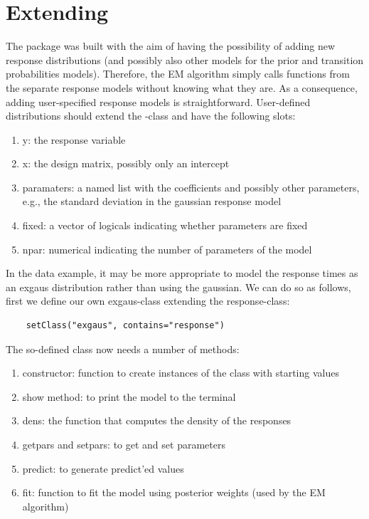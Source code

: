 \documentclass[article]{jss}
\begin{document}
\section[Extending depmixS4]{Extending }

The  package was built with the aim of having the 
possibility of adding new response distributions (and possibly also 
other models for the prior and transition probabilities models). 
Therefore, the EM algorithm simply calls  functions from the 
separate response models without knowing what they are. As a 
consequence, adding user-specified response models is straightforward. 
User-defined distributions should extend the -class 
and have the following slots:
\begin{enumerate}
	\item y: the response variable
	\item x: the design matrix, possibly only an intercept
	\item paramaters: a named list with the coefficients and possibly 
	other parameters, e.g., the standard deviation in the gaussian 
	response model
	\item fixed: a vector of logicals indicating whether parameters are 
	fixed
	\item npar: numerical indicating the number of parameters of the model
\end{enumerate}

In the  data example, it may be more appropriate to model
the response times as an exgaus distribution rather than using the
gaussian.  We can do so as follows, first we define our own
exgaus-class extending the response-class:
\begin{verbatim}
	setClass("exgaus", contains="response")
\end{verbatim}

The so-defined class now needs a number of methods: 
\begin{enumerate}
	\item constructor: function to create instances of the class 
	with starting values
	\item show method: to print the model to the terminal
	\item dens: the function that computes the density of the responses
	\item getpars and setpars: to get and set parameters 
	\item predict: to generate predict'ed values 
	\item fit: function to fit the model using posterior weights (used 
	by the EM algorithm)
\end{enumerate}
\end{document}
